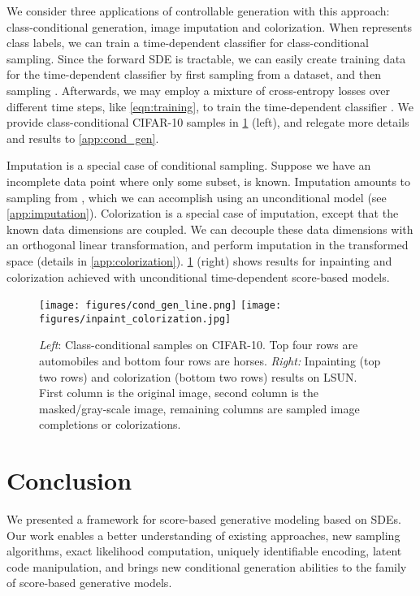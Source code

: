 \documentclass{article} \usepackage{iclr2021_conference,times}
\begin{document}
We consider three applications of controllable generation with this approach: class-conditional generation, image imputation and colorization. When  represents class labels, we can train a time-dependent classifier  for class-conditional sampling. Since the forward SDE is tractable, we can easily create training data  for the time-dependent classifier
by first sampling  from a dataset, and then sampling . Afterwards, we may employ a mixture of cross-entropy losses over different time steps, like \cref{eqn:training}, to train the time-dependent classifier . We provide class-conditional CIFAR-10 samples in \cref{fig:cond_gen} (left), and relegate more details and results to \cref{app:cond_gen}.

Imputation is a special case of conditional sampling.
Suppose we have an incomplete data point  where only some subset,  is known. Imputation amounts to sampling from , which we can accomplish using an unconditional model (see \cref{app:imputation}). Colorization is a special case of imputation, except that the known data dimensions are coupled. We can decouple these data dimensions with an orthogonal linear transformation, and perform imputation in the transformed space (details in \cref{app:colorization}). \cref{fig:cond_gen} (right) shows results for inpainting and colorization achieved with unconditional time-dependent score-based models.


\begin{figure}
    \centering
    \texttt{[image: figures/cond\_gen\_line.png]}
    \texttt{[image: figures/inpaint\_colorization.jpg]}
    \caption{\textit{Left}: Class-conditional samples on  CIFAR-10. Top four rows are automobiles and bottom four rows are horses. \textit{Right:} Inpainting (top two rows) and colorization (bottom two rows) results on  LSUN. First column is the original image, second column is the masked/gray-scale image, remaining columns are sampled image completions or colorizations.}
    \label{fig:cond_gen}
\end{figure}
 \section{Conclusion}
We presented a framework for score-based generative modeling based on SDEs. Our work enables a better understanding of existing approaches,  new sampling algorithms, exact likelihood computation, uniquely identifiable encoding, latent code manipulation, and brings new conditional generation abilities to the family of score-based generative models.
\end{document}
